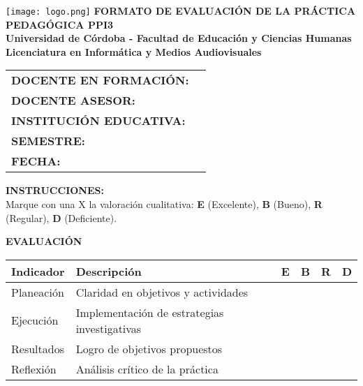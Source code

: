 \documentclass[a4paper,12pt]{article}
\begin{document}
\begin{center}
    \vspace*{1cm}
    \texttt{[image: logo.png]} %
    \vspace{0.5cm}
    \textbf{\Large FORMATO DE EVALUACIÓN DE LA PRÁCTICA PEDAGÓGICA PPI3} \\
    \vspace{0.5cm}
    \textbf{Universidad de Córdoba - Facultad de Educación y Ciencias Humanas} \\
    \textbf{Licenciatura en Informática y Medios Audiovisuales}
\end{center}

\vspace{0.5cm}
\begin{tabularx}{\textwidth}{@{}p{5cm}X@{}}
    \toprule
    \textbf{DOCENTE EN FORMACIÓN:} & \hrulefill \\
    \textbf{DOCENTE ASESOR:} & \hrulefill \\
    \textbf{INSTITUCIÓN EDUCATIVA:} & \hrulefill \\
    \textbf{SEMESTRE:} & \hrulefill \\
    \textbf{FECHA:} & \hrulefill \\
    \bottomrule
\end{tabularx}

\vspace{0.5cm}
\noindent
\textbf{INSTRUCCIONES:} \\
Marque con una X la valoración cualitativa: \textbf{E} (Excelente), \textbf{B} (Bueno), \textbf{R} (Regular), \textbf{D} (Deficiente).

\vspace{0.5cm}
\noindent
\textbf{EVALUACIÓN}
\begin{table}[h]
    \centering
    \scriptsize
    \begin{tabularx}{\textwidth}{|p{5cm}|X|c|c|c|c|}
        \hline
        \textbf{Indicador} & \textbf{Descripción} & \textbf{E} & \textbf{B} & \textbf{R} & \textbf{D} \\
        \hline
        Planeación & Claridad en objetivos y actividades & & & & \\ \hline
        Ejecución & Implementación de estrategias investigativas & & & & \\ \hline
        Resultados & Logro de objetivos propuestos & & & & \\ \hline
        Reflexión & Análisis crítico de la práctica & & & & \\ \hline
    \end{tabularx}
\end{table}
\end{document}
